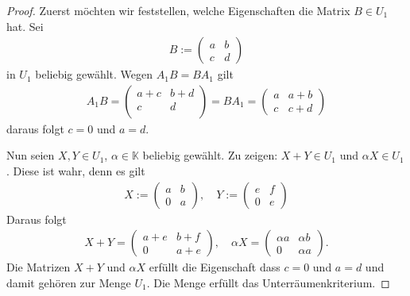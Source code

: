 \documentclass[12pt]{extarticle}
\newcommand{\mg}[1]{\mathbb{#1}}
\begin{document}
\begin{proof}
  Zuerst möchten wir feststellen, welche Eigenschaften
  die Matrix \(B \in U_1\) hat.  Sei
\begin{align*}
B :=
  \begin{pmatrix}
    a & b\\
    c & d
  \end{pmatrix}
\end{align*}
in \(U_1\) beliebig gewählt. Wegen \(A_1B=BA_1\) gilt
\begin{align*}
A_1B=
\begin{pmatrix}
  a+c & b+d \\
  c & d\\
\end{pmatrix} =
  BA_1 =
\begin{pmatrix}
  a & a+b \\
  c & c+d
\end{pmatrix}
\end{align*}
daraus folgt \(c=0\) und \(a = d\).

Nun seien  \(X, Y \in U_1\), \(\alpha \in \mg{K}\) beliebig
gewählt.  Zu zeigen: \(X + Y \in U_1\) und $\alpha X \in
U_1$.  Diese ist wahr, denn es gilt
\begin{align*}
X :=
  \begin{pmatrix}
    a & b \\
    0 & a
  \end{pmatrix}, \quad
Y:=
\begin{pmatrix}
  e & f \\
  0 & e
\end{pmatrix}
\end{align*}
Daraus folgt
\begin{align*}
X + Y =
\begin{pmatrix}
  a + e & b + f \\
  0 & a + e
\end{pmatrix}, \quad
  \alpha X =
  \begin{pmatrix}
    \alpha a & \alpha b \\
    0 & \alpha a
  \end{pmatrix}.
\end{align*}
Die Matrizen \(X + Y\) und \(\alpha X\)  erfüllt die
Eigenschaft dass \(c = 0\) und \(a = d\) und damit gehören
zur Menge \(U_1\).  Die Menge erfüllt das Unterräumenkriterium.


\end{proof}
\end{document}
